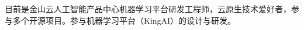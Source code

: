 

\begin{cvparagraph}
\begin{minipage}[t]{\textwidth}
目前是金山云人工智能产品中心机器学习平台研发工程师，云原生技术爱好者，参与多个开源项目。参与机器学习平台（KingAI）的设计与研发。
\end{minipage}
\end{cvparagraph}

